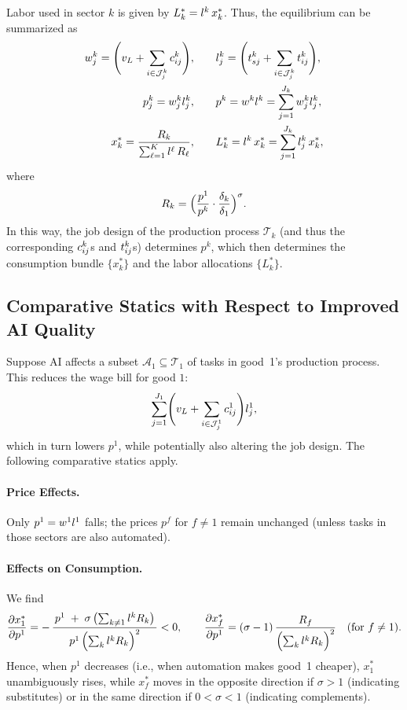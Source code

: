 \documentclass{article}
\theoremstyle{plain}
\theoremstyle{plain}
\begin{document}
Labor used in sector $k$ is given by $L_k^* = l_{}^k\,x_k^*$.
Thus, the equilibrium can be summarized as
\begin{align*}
w_j^k = \Biggl(v_L + \sum_{i \in \mathcal{J}_j^k} c_{ij}^{k}\Biggr), 
& \qquad
l_{j}^k = \Biggl(t_{sj}^k + \sum_{i \in \mathcal{J}_j^k} t_{ij}^{k}\Biggr), \\
p_j^k = w_j^k l_{j}^k,
& \qquad
p^k = w^k l_{}^k = \sum_{j=1}^{J_k} w_j^k l_{j}^k, \\
x_k^* = \frac{R_k}{\sum_{\ell=1}^K l_{}^\ell\,R_\ell},
& \qquad
L_k^* = l_{}^k\,x_k^* = \sum_{j=1}^{J_k} l_{j}^k\,x_k^*,
\end{align*}
where
\[
R_k = \Bigl(\frac{p^1}{p^k} \cdot \frac{\delta_k}{\delta_1}\Bigr)^{\sigma}.
\]
In this way, the job design of the production process $\mathcal{T}_k$ (and thus the corresponding $c_{ij}^k$s and $t_{ij}^k$s) determines $p^k$, which then determines the consumption bundle $\{x_k^*\}$ and the labor allocations $\{L_k^*\}$.


\subsection{Comparative Statics with Respect to Improved AI Quality}

Suppose AI affects a subset $\mathcal{A}_1 \subseteq \mathcal{T}_1$ of tasks in good~1’s production process.  
This reduces the wage bill for good $1$:
\[
\sum_{j=1}^{J_1} \Biggl( v_L + \sum_{i \in \mathcal{J}_j^1} c_{ij}^{1} \Biggr) l_{j}^1,
\]
which in turn lowers $p^1$, while potentially also altering the job design.  
The following comparative statics apply.

\paragraph{Price Effects.}
Only $p^1 = w^1 l_{}^1$ falls; the prices $p^f$ for $f\neq 1$ remain unchanged (unless tasks in those sectors are also automated).

\paragraph{Effects on Consumption.}
We find
\[
\frac{\partial x_{1}^*}{\partial p^1}
=
-\,
\frac{\,p^1 \;+\;\sigma\,\bigl(\sum_{k\neq 1}l_{}^kR_{k}\bigr)\,}{
       p^1\,\Bigl(\sum_{k}l_{}^kR_{k}\Bigr)^{2}}
<0,
\qquad
\frac{\partial x_{f}^*}{\partial p^1}
=
(\sigma-1)
\,\frac{\,R_{f}\,}{\Bigl(\sum_{k}l_{}^kR_{k}\Bigr)^{2}}
\quad (\text{for } f\neq 1).
\]
Hence, when $p^1$ decreases (i.e., when automation makes good~1 cheaper), $x_{1}^*$ unambiguously rises, while $x_{f}^*$ moves in the opposite direction if $\sigma>1$ (indicating substitutes) or in the same direction if $0<\sigma<1$ (indicating complements).
\end{document}
